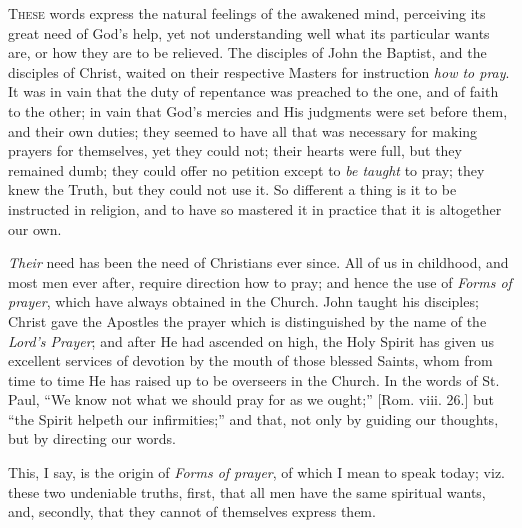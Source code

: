 T\textsc{hese} words express the natural feelings of the
awakened mind, perceiving its great need of God's help,
yet not understanding well what its particular wants are,
or how they are to be relieved. The disciples of John the
Baptist, and the disciples of Christ, waited on their
respective Masters for instruction \emph{how to pray}. It
was in vain that the duty of repentance was preached to
the one, and of faith to the other; in vain that God's
mercies and His judgments were set before them, and their
own duties; they seemed to have all that was necessary
for making prayers for themselves, yet they could not;
their hearts were full, but they remained dumb; they
could offer no petition except to \emph{be taught} to
pray; they knew the Truth, but they could not use it. So
different a thing is it to be instructed in religion, and
to have so mastered it in practice that it is altogether
our own.

\emph{Their} need has been the need of Christians ever
since. All of us in childhood, and most men ever after,
require direction how to pray; and hence the use of \emph{Forms
of prayer}, which have always obtained in the Church.
John taught his disciples; Christ gave the Apostles the
prayer which is distinguished by the name of the \emph{Lord's
Prayer}; and after He had ascended on high, the Holy
Spirit has given us excellent services of devotion by the
mouth of those blessed Saints, whom from time to time He
has raised up to be overseers in the Church. In the words
of St. Paul, ``We know not what we should pray for as
we ought;'' [Rom. viii. 26.] but ``the Spirit
helpeth our infirmities;'' and that, not only by
guiding our thoughts, but by directing our words.

This, I say, is the origin of \emph{Forms of prayer},
of which I mean to speak today; viz. these two undeniable
truths, first, that all men have the same spiritual
wants, and, secondly, that they cannot of themselves
express them.

